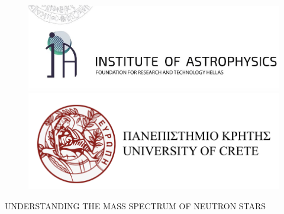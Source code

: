 \documentclass[a4paper, 10pt, twoside]{book}
\def\title{UNDERSTANDING THE MASS SPECTRUM OF NEUTRON STARS}
\begin{document}
    \frontmatter  %
    


    
    \begin{titlepage}
    	\begin{figure}[!t]
        
    		\begin{minipage}{.5\textwidth}    
            	\includegraphics[scale=0.2]{figures/iaforth_logo.jpeg}
    		\end{minipage}%
    		\begin{minipage}{0.5\textwidth}
        		\hspace{2.5cm} \includegraphics[scale=0.21]{figures/uoc_logo.png}
		    \end{minipage}
	\end{figure}
	
        \begin{center} 
            \vspace*{2.5cm}
            \Large \title 
            \vspace{5cm}
            

\end{center}
\end{titlepage}
\end{document}

